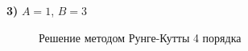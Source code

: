 	
		\newpage
		\thispagestyle{empty}
		\begin{landscape}
			\textbf{3)} $A = 1$, $B = 3$	
			\begin{figure}[h!]
				\begin{minipage}[h]{0.55\linewidth}
				\end{minipage}
				\hfill
				\begin{minipage}[h]{0.55\linewidth}
				\end{minipage}
				\caption{Решение методом Рунге-Кутты 4 порядка}
			\end{figure}
			\fillandplacepagenumber
		\end{landscape}
		

